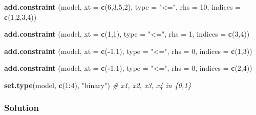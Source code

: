 \documentclass[]{article}
\newenvironment{Shaded}{\begin{snugshade}}{\end{snugshade}}
\newcommand{\CommentTok}[1]{\textcolor[rgb]{0.56,0.35,0.01}{\textit{#1}}}
\newcommand{\DataTypeTok}[1]{\textcolor[rgb]{0.13,0.29,0.53}{#1}}
\newcommand{\DecValTok}[1]{\textcolor[rgb]{0.00,0.00,0.81}{#1}}
\newcommand{\KeywordTok}[1]{\textcolor[rgb]{0.13,0.29,0.53}{\textbf{#1}}}
\newcommand{\NormalTok}[1]{#1}
\newcommand{\OperatorTok}[1]{\textcolor[rgb]{0.81,0.36,0.00}{\textbf{#1}}}
\newcommand{\StringTok}[1]{\textcolor[rgb]{0.31,0.60,0.02}{#1}}
\begin{document}
\begin{Shaded}
\begin{Highlighting}[]
\KeywordTok{add.constraint}\NormalTok{ (model,}
               \DataTypeTok{xt =} \KeywordTok{c}\NormalTok{(}\DecValTok{6}\NormalTok{,}\DecValTok{3}\NormalTok{,}\DecValTok{5}\NormalTok{,}\DecValTok{2}\NormalTok{),}
               \DataTypeTok{type =} \StringTok{"<="}\NormalTok{,}
               \DataTypeTok{rhs =} \DecValTok{10}\NormalTok{,}
               \DataTypeTok{indices =} \KeywordTok{c}\NormalTok{(}\DecValTok{1}\NormalTok{,}\DecValTok{2}\NormalTok{,}\DecValTok{3}\NormalTok{,}\DecValTok{4}\NormalTok{))}

\KeywordTok{add.constraint}\NormalTok{ (model,}
               \DataTypeTok{xt =} \KeywordTok{c}\NormalTok{(}\DecValTok{1}\NormalTok{,}\DecValTok{1}\NormalTok{),}
               \DataTypeTok{type =} \StringTok{"<="}\NormalTok{,}
               \DataTypeTok{rhs =} \DecValTok{1}\NormalTok{,}
               \DataTypeTok{indices =} \KeywordTok{c}\NormalTok{(}\DecValTok{3}\NormalTok{,}\DecValTok{4}\NormalTok{))}

\KeywordTok{add.constraint}\NormalTok{ (model,}
               \DataTypeTok{xt =} \KeywordTok{c}\NormalTok{(}\OperatorTok{-}\DecValTok{1}\NormalTok{,}\DecValTok{1}\NormalTok{),}
               \DataTypeTok{type =} \StringTok{"<="}\NormalTok{,}
               \DataTypeTok{rhs =} \DecValTok{0}\NormalTok{,}
               \DataTypeTok{indices =} \KeywordTok{c}\NormalTok{(}\DecValTok{1}\NormalTok{,}\DecValTok{3}\NormalTok{))}

\KeywordTok{add.constraint}\NormalTok{ (model,}
               \DataTypeTok{xt =} \KeywordTok{c}\NormalTok{(}\OperatorTok{-}\DecValTok{1}\NormalTok{,}\DecValTok{1}\NormalTok{),}
               \DataTypeTok{type =} \StringTok{"<="}\NormalTok{,}
               \DataTypeTok{rhs =} \DecValTok{0}\NormalTok{,}
               \DataTypeTok{indices =} \KeywordTok{c}\NormalTok{(}\DecValTok{2}\NormalTok{,}\DecValTok{4}\NormalTok{))}

\KeywordTok{set.type}\NormalTok{(model, }\KeywordTok{c}\NormalTok{(}\DecValTok{1}\OperatorTok{:}\DecValTok{4}\NormalTok{), }\StringTok{"binary"}\NormalTok{) }\CommentTok{# x1, x2, x3, x4 in \{0,1\}}
\end{Highlighting}
\end{Shaded}

\hypertarget{solution}{%
\subsubsection{Solution}\label{solution}}
\end{document}
